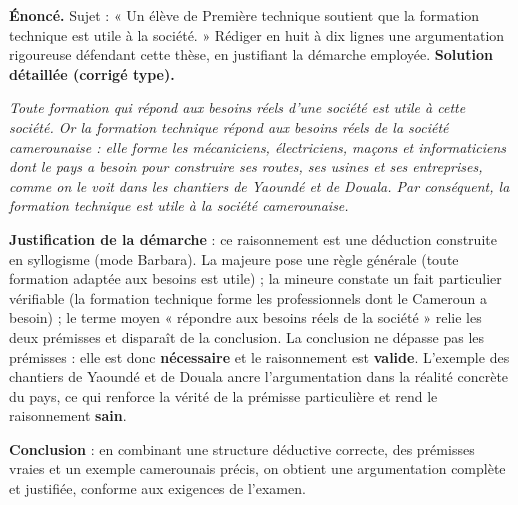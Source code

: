 \documentclass[11pt]{article}
\newcommand{\cle}[1]{{\popxbold\color{popdark}#1}}
\begin{document}
\begin{exoresolu}
\textbf{Énoncé.} Sujet : « Un élève de Première technique soutient que la formation technique est utile à la société. » Rédiger en huit à dix lignes une argumentation rigoureuse défendant cette thèse, en justifiant la démarche employée.
\tcblower
\textbf{Solution détaillée (corrigé type).}

\emph{Toute formation qui répond aux besoins réels d'une société est utile à cette société. Or la formation technique répond aux besoins réels de la société camerounaise : elle forme les mécaniciens, électriciens, maçons et informaticiens dont le pays a besoin pour construire ses routes, ses usines et ses entreprises, comme on le voit dans les chantiers de Yaoundé et de Douala. Par conséquent, la formation technique est utile à la société camerounaise.}

\textbf{Justification de la démarche} : ce raisonnement est une \cle{déduction} construite en \cle{syllogisme} (mode Barbara). La majeure pose une règle générale (toute formation adaptée aux besoins est utile) ; la mineure constate un fait particulier vérifiable (la formation technique forme les professionnels dont le Cameroun a besoin) ; le terme moyen « répondre aux besoins réels de la société » relie les deux prémisses et disparaît de la conclusion. La conclusion ne dépasse pas les prémisses : elle est donc \textbf{nécessaire} et le raisonnement est \textbf{valide}. L'exemple des chantiers de Yaoundé et de Douala ancre l'argumentation dans la réalité concrète du pays, ce qui renforce la vérité de la prémisse particulière et rend le raisonnement \textbf{sain}.

\textbf{Conclusion} : en combinant une structure déductive correcte, des prémisses vraies et un exemple camerounais précis, on obtient une argumentation complète et justifiée, conforme aux exigences de l'examen.
\end{exoresolu}
\end{document}
